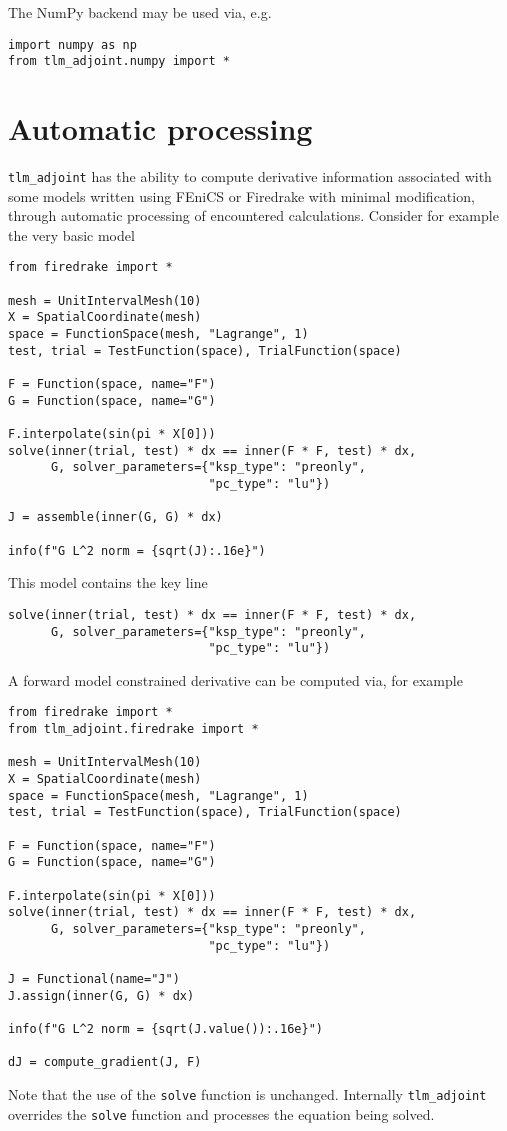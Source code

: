 \documentclass[11pt]{article}
\begin{document}
The NumPy backend may be used via, e.g.
\begin{lstlisting}
import numpy as np
from tlm_adjoint.numpy import *
\end{lstlisting}

\section{Automatic processing}\label{sect:overrides}

\texttt{tlm\_adjoint} has the ability to compute derivative information
associated with some models written using FEniCS or Firedrake with minimal
modification, through automatic processing of encountered calculations.
Consider for example the very basic model
\begin{lstlisting}
from firedrake import *

mesh = UnitIntervalMesh(10)
X = SpatialCoordinate(mesh)
space = FunctionSpace(mesh, "Lagrange", 1)
test, trial = TestFunction(space), TrialFunction(space)

F = Function(space, name="F")
G = Function(space, name="G")

F.interpolate(sin(pi * X[0]))
solve(inner(trial, test) * dx == inner(F * F, test) * dx,
      G, solver_parameters={"ksp_type": "preonly",
                            "pc_type": "lu"})

J = assemble(inner(G, G) * dx)

info(f"G L^2 norm = {sqrt(J):.16e}")
\end{lstlisting}
This model contains the key line
\begin{lstlisting}
solve(inner(trial, test) * dx == inner(F * F, test) * dx,
      G, solver_parameters={"ksp_type": "preonly",
                            "pc_type": "lu"})
\end{lstlisting}

A forward model constrained derivative can be computed via, for example
\begin{lstlisting}
from firedrake import *
from tlm_adjoint.firedrake import *

mesh = UnitIntervalMesh(10)
X = SpatialCoordinate(mesh)
space = FunctionSpace(mesh, "Lagrange", 1)
test, trial = TestFunction(space), TrialFunction(space)

F = Function(space, name="F")
G = Function(space, name="G")

F.interpolate(sin(pi * X[0]))
solve(inner(trial, test) * dx == inner(F * F, test) * dx,
      G, solver_parameters={"ksp_type": "preonly",
                            "pc_type": "lu"})

J = Functional(name="J")
J.assign(inner(G, G) * dx)

info(f"G L^2 norm = {sqrt(J.value()):.16e}")

dJ = compute_gradient(J, F)
\end{lstlisting}
Note that the use of the \texttt{solve} function is unchanged. Internally
\texttt{tlm\_adjoint} overrides the \texttt{solve} function and processes the
equation being solved.
\end{document}
